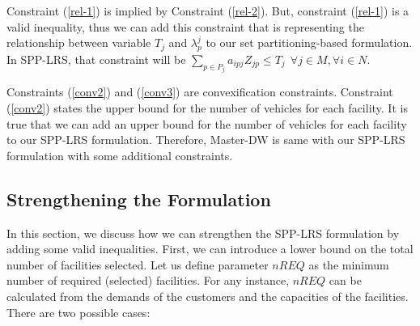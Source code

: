 
Constraint (\ref{rel-1}) is implied by Constraint (\ref{rel-2}). But, constraint (\ref{rel-1})
is a valid inequality, thus we can add this constraint that is representing the relationship 
between variable $T_j$ and $\lambda^j_{p}$ to our set partitioning-based formulation. 
In SPP-LRS, that constraint will be 
$\sum_{p \in P_j}a_{ipj}Z_{jp} \leq  T_{j}\ \ \forall j \in M, \forall i \in N$. 

Constraints (\ref{conv2}) and (\ref{conv3}) are convexification constraints. Constraint 
(\ref{conv2}) states the upper bound for the number of vehicles for each facility. 
It is true that we can add an upper bound for the number of vehicles for
each facility to our SPP-LRS formulation. Therefore, Master-DW is same with 
our SPP-LRS formulation with some additional constraints.     


\subsection{Strengthening the Formulation}
\label{StrongForm}
In this section, we discuss how we can strengthen the SPP-LRS formulation by adding 
some valid inequalities. First, we can introduce a lower bound on the total 
number of facilities selected. Let us define parameter  $nREQ$ as the minimum 
number of required (selected) facilities. For any instance, $nREQ$ can be calculated 
from the demands of the customers and the capacities of the facilities. There are 
two possible cases:

